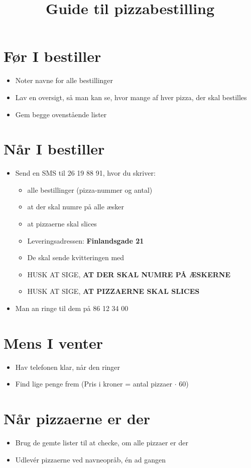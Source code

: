 \documentclass[a4paper,danish]{article}
\title{Guide til pizzabestilling}
\author{}
\begin{document}
\maketitle

\section{Før I bestiller}
\begin{itemize}
  \item Noter navne for alle bestillinger
  \item Lav en oversigt, så man kan se, hvor mange af hver pizza, der skal bestilles
    \item Gem begge ovenstående lister
\end{itemize}
\section{Når I bestiller}
\begin{itemize}
  \item Send en SMS til 26 19 88 91, hvor du skriver:
    \begin{itemize}
      \item alle bestillinger (pizza-nummer og antal)
      \item at der skal numre på alle æsker
      \item at pizzaerne skal slices 
      \item Leveringsadressen: \textbf{Finlandsgade 21}
      \item De skal sende kvitteringen med
      \item HUSK AT SIGE, \textbf{AT DER SKAL NUMRE PÅ ÆSKERNE}
      \item HUSK AT SIGE, \textbf{AT PIZZAERNE SKAL SLICES} 
    \end{itemize}
  \item Man an ringe til dem på 86 12 34 00
\end{itemize}

\section{Mens I venter}
\begin{itemize}
  \item Hav telefonen klar, når den ringer
  \item Find lige penge frem (Pris i kroner = antal pizzaer $\cdot$ 60)
\end{itemize}

\section{Når pizzaerne er der}
\begin{itemize}
  \item Brug de gemte lister til at checke, om alle pizzaer er der
  \item Udlevér pizzaerne ved navneopråb, én ad gangen
\end{itemize}
\end{document}
